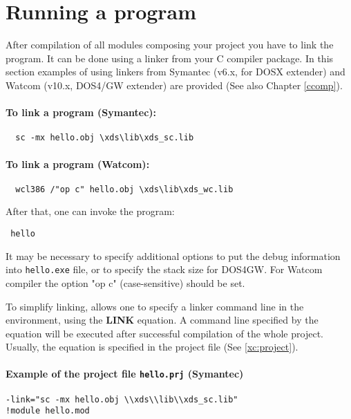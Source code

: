 \section{Running a program}\label{start:run}

\ifgencode        %
  After compilation of all modules composing your project you have
  to link the program. It can be done using a linker from your
  C compiler package. In this section examples of using linkers
  from Symantec (v6.x, for DOSX extender) and Watcom (v10.x,
  DOS4/GW extender) are provided (See also Chapter \ref{ccomp}).

  \paragraph{To link a program (Symantec):}
\begin{verbatim}
  sc -mx hello.obj \xds\lib\xds_sc.lib
\end{verbatim}

  \paragraph{To link a program (Watcom):}
\begin{verbatim}
  wcl386 /"op c" hello.obj \xds\lib\xds_wc.lib
\end{verbatim}
  After that, one can invoke the program:
  \begin{flushleft} \tt
        hello
  \end{flushleft}

  It may be necessary to specify additional options to put the debug
  information into {\tt hello.exe} file, or to specify the stack size for
  DOS4GW. For Watcom compiler the option "op c" (case-sensitive) should
  be set.

  To simplify linking, \XDS{} allows one to specify a linker command line
  in the \XDS{} environment, using the {\bf LINK} equation.
  A command line
  specified by the equation will be executed after successful
  compilation of the whole project. Usually, the equation is specified
  in the project file (See \ref{xc:project}).

\paragraph{Example of the project file {\tt hello.prj} (Symantec)}
\begin{verbatim}
-link="sc -mx hello.obj \\xds\\lib\\xds_sc.lib"
!module hello.mod
\end{verbatim}

